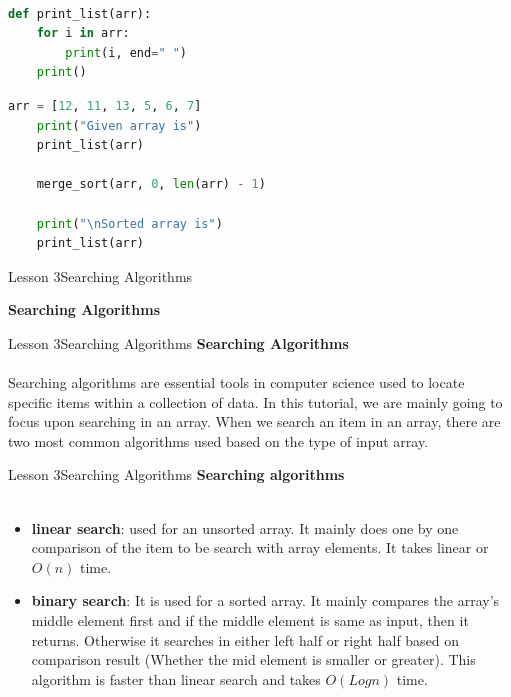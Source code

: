 \documentclass[aspectratio=1610]{beamer}
\begin{document}
\begin{frame}[fragile]
\begin{lstlisting}[language=Python]

def print_list(arr):
    for i in arr:
        print(i, end=" ")
    print()
\end{lstlisting}
\end{frame}


\begin{frame}[fragile]
\begin{lstlisting}[language=Python]
    arr = [12, 11, 13, 5, 6, 7]
    print("Given array is")
    print_list(arr)

    merge_sort(arr, 0, len(arr) - 1)

    print("\nSorted array is")
    print_list(arr)    
\end{lstlisting}
\end{frame}





\begin{frame}{Lesson 3}{Searching Algorithms}
\begin{center}
\Huge \textbf{Searching Algorithms}
\end{center}
\end{frame}


\begin{frame}{Lesson 3}{Searching Algorithms}
\LARGE
\textbf{Searching Algorithms}\\~\\
Searching algorithms are essential tools in computer science used to locate specific items 
within a collection of data. In this tutorial, we are mainly going to focus upon searching 
in an array. When we search an item in an array, there are two most common algorithms used 
based on the type of input array.
\end{frame}



\begin{frame}{Lesson 3}{Searching Algorithms}
\LARGE
\textbf{Searching algorithms}\\~\\
\Large
\begin{itemize}
	\item \textbf{linear search}: used for an unsorted array. It mainly does one by one comparison of the item to be search with array elements. It takes linear or $O(n)$ time.
	\item \textbf{binary search}: It is used for a sorted array. It mainly compares the array's middle element first and if the middle element is same as input, then it returns. Otherwise it searches in either left half or right half based on comparison result (Whether the mid element is smaller or greater). This algorithm is faster than linear search and takes $O(Log n)$ time.
\end{itemize}
\end{frame}
\end{document}
